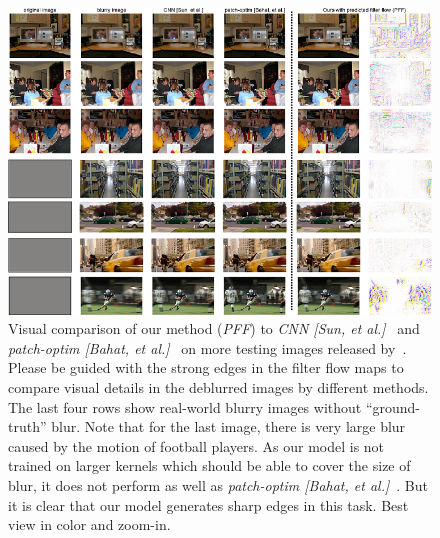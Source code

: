 \begin{figure}[t]
    \centering
    \begin{minipage}{0.97\textwidth}
        \centering
        \includegraphics[width=1\linewidth]{supple_blur.png}
    \end{minipage}
    \caption{Visual comparison of our method (\emph{PFF}) to \emph{CNN [Sun, et al.]}~\cite{sun2015learning} and
    \emph{patch-optim [Bahat, et al.]}~\cite{bahat2017non}
    on more testing images released by~\cite{bahat2017non}.
    Please be guided with the strong edges in the filter flow maps to compare visual details in the deblurred images by different methods.
    The last four rows show real-world blurry images without ``ground-truth'' blur.
    Note that for the last image,
    there is very large blur caused by the motion of football players.
    As our model is not trained on larger kernels which should be able to cover the size of blur,
    it does not perform as well as \emph{patch-optim [Bahat, et al.]}~\cite{bahat2017non}.
    But it is clear that our model generates sharp edges in this task.
    Best view in color and zoom-in.}
    \label{fig:more_motionblur}
\end{figure}




